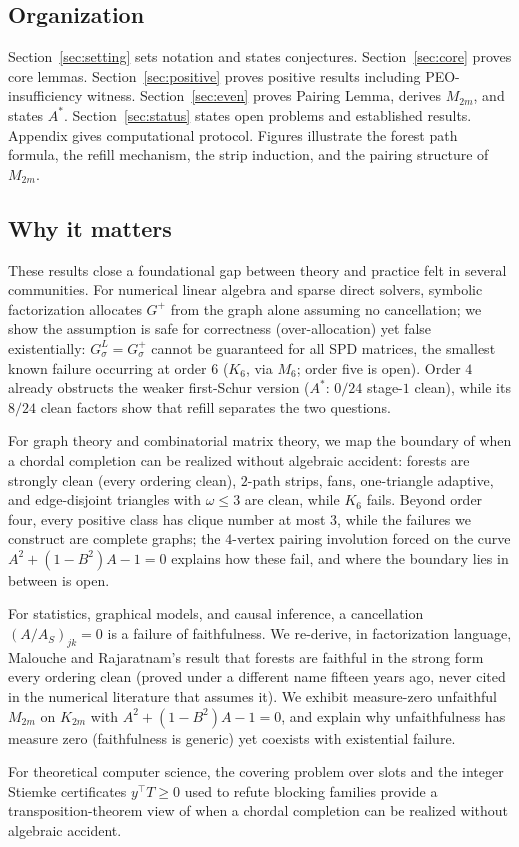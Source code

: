 \documentclass[11pt]{article}
\theoremstyle{plain}
\theoremstyle{definition}
\theoremstyle{remark}
\begin{document}
\begin{humanblock}
\subsection{Organization}

Section~\ref{sec:setting} sets notation and states conjectures. Section~\ref{sec:core} proves core lemmas. Section~\ref{sec:positive} proves positive results including PEO-insufficiency witness. Section~\ref{sec:even} proves Pairing Lemma, derives $M_{2m}$, and states $A^*$. Section~\ref{sec:status} states open problems and established results. Appendix gives computational protocol. Figures illustrate the forest path formula, the refill mechanism, the strip induction, and the pairing structure of $M_{2m}$.

\subsection{Why it matters}\label{sec:why}
These results close a foundational gap between theory and practice felt in several communities. For numerical linear algebra and sparse direct solvers, symbolic factorization allocates $G^+$ from the graph alone assuming no cancellation; we show the assumption is safe for correctness (over-allocation) yet false existentially: $G^L_\sigma=G^+_\sigma$ cannot be guaranteed for all SPD matrices, the smallest known failure occurring at order $6$ ($K_6$, via $M_6$; order five is open). Order $4$ already obstructs the weaker first-Schur version ($A^*$: $0/24$ stage-$1$ clean), while its $8/24$ clean factors show that refill separates the two questions.

For graph theory and combinatorial matrix theory, we map the boundary of when a chordal completion can be realized without algebraic accident: forests are strongly clean (every ordering clean), $2$-path strips, fans, one-triangle adaptive, and edge-disjoint triangles with $\omega\le3$ are clean, while $K_6$ fails. Beyond order four, every positive class has clique number at most $3$, while the failures we construct are complete graphs; the $4$-vertex pairing involution forced on the curve $A^2+(1-B^2)A-1=0$ explains how these fail, and where the boundary lies in between is open.

For statistics, graphical models, and causal inference, a cancellation $(A/A_S)_{jk}=0$ is a failure of faithfulness. We re-derive, in factorization language, Malouche and Rajaratnam's result that forests are faithful in the strong form every ordering clean (proved under a different name fifteen years ago, never cited in the numerical literature that assumes it). We exhibit measure-zero unfaithful $M_{2m}$ on $K_{2m}$ with $A^2+(1-B^2)A-1=0$, and explain why unfaithfulness has measure zero (faithfulness is generic) yet coexists with existential failure.

For theoretical computer science, the covering problem over slots and the integer Stiemke certificates $y^\top T\ge0$ used to refute blocking families provide a transposition-theorem view of when a chordal completion can be realized without algebraic accident.
\end{humanblock}
\end{document}

